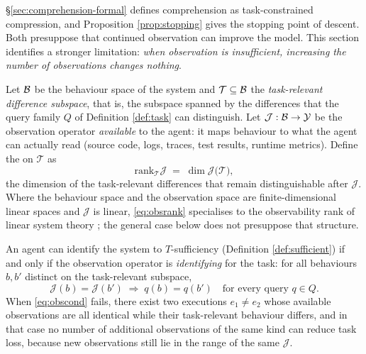 \S\ref{sec:comprehension-formal} defines comprehension as task-constrained compression, and
Proposition \ref{prop:stopping} gives the stopping point of descent. Both presuppose that
continued observation can improve the model. This section identifies a stronger limitation:
\emph{when observation is insufficient, increasing the number of observations changes
nothing}.

\begin{definition}\label{def:observability}
Let $\mathcal{B}$ be the behaviour space of the system and $\mathcal{T} \subseteq \mathcal{B}$ the
\emph{task-relevant difference subspace}, that is, the subspace spanned by the differences
that the query family $Q$ of Definition \ref{def:task} can distinguish. Let
$\mathcal{J} : \mathcal{B} \to \mathcal{Y}$ be the observation operator \emph{available} to the
agent: it maps behaviour to what the agent can actually read (source code, logs, traces, test
results, runtime metrics). Define the  on $\mathcal{T}$ as
\begin{equation}\label{eq:obsrank}
\mathrm{rank}_{\mathcal{T}}\mathcal{J} \;=\;
\dim \mathcal{J}\bigl(\mathcal{T}\bigr),
\end{equation}
the dimension of the task-relevant differences that remain distinguishable after
$\mathcal{J}$. Where the behaviour space and the observation space are finite-dimensional linear
spaces and $\mathcal{J}$ is linear, \eqref{eq:obsrank} specialises to the observability rank of
linear system theory \cite{kalman1960}; the general case below does not presuppose that structure.
\end{definition}

\begin{proposition}\label{prop:observability}
An agent can identify the system to $T$-sufficiency (Definition \ref{def:sufficient}) if and
only if the observation operator is \emph{identifying} for the task: for all behaviours
$b, b'$ distinct on the task-relevant subspace,
\begin{equation}\label{eq:obscond}
\mathcal{J}(b) = \mathcal{J}(b') \;\Longrightarrow\; q(b) = q(b') \quad \text{for every query } q \in Q .
\end{equation}
When \eqref{eq:obscond} fails, there exist two executions $e_1 \ne e_2$ whose available
observations are all identical while their task-relevant behaviour differs, and in that case no
number of additional observations of the same kind can reduce task loss, because new observations
still lie in the range of the same $\mathcal{J}$.
\end{proposition}

